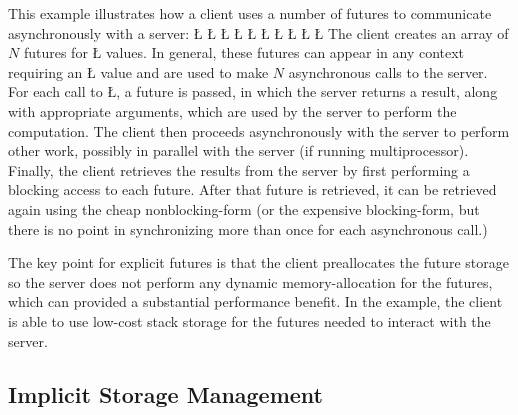 \documentclass[openright,twoside]{report}
\begin{document}
This example illustrates how a client uses a number of futures to communicate asynchronously with a server:
\LGinlinefalse\LGbegin\lgrinde
\L{}
\CE{}\L{}
\CE{}\L{}
\CE{}\L{\LB{}}
\CE{}\L{\LB{\}}}
\L{}
\CE{}\L{}
\CE{}\L{\LB{}}
\CE{}\L{\LB{}}
\CE{}\L{\LB{\}}}
\endlgrinde\LGend
The client creates an array of $N$ futures for \LGinlinetrue\LGbegin\lgrinde\L{}\endlgrinde\LGend{} values.
In general, these futures can appear in any context requiring an \LGinlinetrue\LGbegin\lgrinde\L{}\endlgrinde\LGend{} value and are used to make $N$ asynchronous calls to the server.
For each call to \LGinlinetrue\LGbegin\lgrinde\L{}\endlgrinde\LGend{}, a future is passed, in which the server returns a result, along with appropriate arguments, which are used by the server to perform the computation.
The client then proceeds asynchronously with the server to perform other work, possibly in parallel with the server (if running multiprocessor).
Finally, the client retrieves the results from the server by first performing a blocking access to each future.
After that future is retrieved, it can be retrieved again using the cheap nonblocking-form (or the expensive blocking-form, but there is no point in synchronizing more than once for each asynchronous call.)

The key point for explicit futures is that the client preallocates the future storage so the server does not perform any dynamic memory-allocation for the futures, which can provided a substantial performance benefit.
In the example, the client is able to use low-cost stack storage for the futures needed to interact with the server.


\subsection{Implicit Storage Management}
\end{document}

